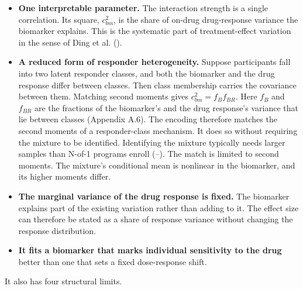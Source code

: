 \documentclass[
  11pt,
]{article}
\providecommand{\tightlist}{%
  \setlength{\itemsep}{0pt}\setlength{\parskip}{0pt}}
\begin{document}
\begin{itemize}
\tightlist
\item
  \textbf{One interpretable parameter.} The interaction strength is a
  single correlation. Its square, \(c_{bm}^2\), is the share of on-drug
  drug-response variance the biomarker explains. This is the
  systematic part of treatment-effect variation in the sense of Ding
  et al. ().
\item
  \textbf{A reduced form of responder heterogeneity.} Suppose participants
  fall into two latent responder classes, and both the biomarker and
  the drug response differ between classes. Then class membership
  carries the covariance between them. Matching second moments gives
  \(c_{bm}^2 = f_B f_{BR}\). Here \(f_B\) and \(f_{BR}\) are the fractions
  of the biomarker's and the drug response's variance that lie between
  classes (Appendix A.6). The encoding therefore matches the second
  moments of a responder-class mechanism. It does so without requiring
  the mixture to be identified. Identifying the mixture typically
  needs larger samples than N-of-1 programs enroll
  (--). The match
  is limited to second moments. The mixture's conditional mean is
  nonlinear in the biomarker, and its higher moments differ.
\item
  \textbf{The marginal variance of the drug response is fixed.} The
  biomarker explains part of the existing variation rather than
  adding to it. The effect size can therefore be stated as a share of
  response variance without changing the response distribution.
\item
  \textbf{It fits a biomarker that marks individual sensitivity to the
  drug} better than one that sets a fixed dose-response shift.
\end{itemize}

It also has four structural limits.
\end{document}
